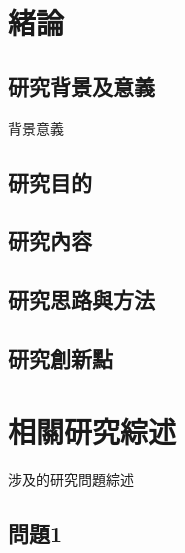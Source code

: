\documentclass[14pt, a4paper,openany]{ctexbook} %
\newcommand{\sihao}{\fontsize{14pt}{\baselineskip}\selectfont}%
\renewcommand\thechapter{第\chinese{chapter}章}  %
\renewcommand{\chaptername}{{\thechapter}}
\numberwithin{figure}{chapter}
\numberwithin{table}{chapter}
\begin{document}
\thispagestyle{plain}
\renewcommand{\contentsname}{目~~~~錄}
\renewcommand{\chaptername}{目錄}
\setcounter{tocdepth}{1}
\begin{spacing}{1.35}\sihao
\tableofcontents
\end{spacing}
\newpage




\chapter{緒論}
\renewcommand{\chaptername}{第\chinese{chapter}章~~緒論}%
\linespread{1.3}\selectfont
\section{研究背景及意義}
背景意義



\section{研究目的}





\section{研究內容}







\section{研究思路與方法}



\section{研究創新點}




\chapter{相關研究綜述}
\renewcommand{\chaptername}{第\chinese{chapter}章~~相關研究綜述}
涉及的研究問題綜述



\section{問題1}
\end{document}
